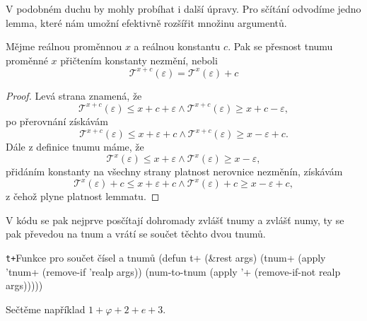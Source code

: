 V podobném duchu by mohly probíhat i další úpravy. Pro sčítání odvodíme jedno lemma, které nám umožní efektivně rozšířit množinu argumentů.

\begin{lemma}
Mějme reálnou proměnnou $x$ a reálnou konstantu $c$. Pak se přesnost tnumu proměnné $x$ přičtením konstanty nezmění, neboli
\begin{equation}
\mathcal{T}^{x+c}(\varepsilon)=\mathcal{T}^x(\varepsilon)+c
\end{equation}
\begin{proof}
Levá strana znamená, že 
\begin{equation}
\mathcal{T}^{x+c}(\varepsilon)\leq x+c+\varepsilon\land\mathcal{T}^{x+c}(\varepsilon)\geq x+c-\varepsilon,
\end{equation}
po přerovnání získávám
\begin{equation}
\mathcal{T}^{x+c}(\varepsilon)\leq x+\varepsilon +c\land\mathcal{T}^{x+c}(\varepsilon)\geq x-\varepsilon +c.
\end{equation}
Dále z definice tnumu máme, že
\begin{equation}
\mathcal{T}^{x}(\varepsilon)\leq x+\varepsilon\land\mathcal{T}^{x}(\varepsilon)\geq x-\varepsilon,
\end{equation}přidáním konstanty na všechny strany platnost nerovnice nezměnín, získávám
\begin{equation}
\mathcal{T}^{x}(\varepsilon)+c\leq x+\varepsilon +c\land\mathcal{T}^{x}(\varepsilon)+c\geq x-\varepsilon +c,
\end{equation}z čehož plyne platnost lemmatu.
\end{proof}
\end{lemma}

V kódu se pak nejprve posčítají dohromady zvlášť tnumy a zvlášť numy, ty se pak převedou na tnum a vrátí se součet těchto dvou tnumů.

\begin{lispcode}{\texttt{t+}}{Funkce pro součet čísel a tnumů}
(\textcolor{funkcionalni}{defun} \textcolor{pojmenovan}{t+} (&rest args)
  (\textcolor{moje}{tnum+} (\textcolor{funkcionalni}{apply} '\textcolor{moje}{tnum+} (\textcolor{funkcionalni}{remove-if} '\textcolor{moje}{realp} args))
    (\textcolor{moje}{num-to-tnum} (\textcolor{funkcionalni}{apply} '\textcolor{moje}{+} (\textcolor{funkcionalni}{remove-if-not} \textquotesingle\textcolor{moje}{realp} args)))))
\end{lispcode}

Sečtěme například $1+\varphi+2+e+3$.

